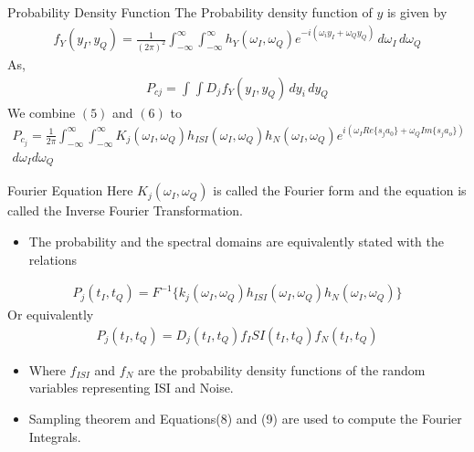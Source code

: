 \documentclass{beamer}
\begin{document}
\begin{frame}{}
\begin{block}{Probability Density Function}
 The Probability density function of $y$ is given by
 \begin{align}
     f_Y(y_I,y_Q) = \frac{1}{(2\pi)^2}\int_{-\infty}^{\infty}\int_{-\infty}^{\infty} h_Y(\omega_I,\omega_Q)e^{-i(\omega_iy _I+\omega_Qy_Q)}\,d\omega_I \,d\omega_Q
     \end{align}
As,
    \begin{align}
        P_{cj}=\int_{}^{}\int{D_j}^{}f_Y(y_I,y_Q)\,dy_i \,dy_Q
    \end{align}
We combine $(5)$ and $(6)$ to
\begin{align}
P_{c_j}=\frac{1}{2\pi}\int_{-\infty}^{\infty}\int_{-\infty}^{\infty}K_j(\omega_I,\omega_Q)h_{ISI}(\omega_I,\omega_Q)h_N(\omega_I,\omega_Q)e^{i(\omega_IRe\{s_ja_0\}+\omega_QIm\{s_ja_o\})}\\ d\omega_Id\omega_Q    
\end{align}
\end{block}
\end{frame}
\begin{frame}{}
    \begin{block}{Fourier Equation}
     Here $K_j(\omega_I,\omega_Q)$ is called the Fourier form and the equation is called the Inverse Fourier Transformation.
     \begin{itemize}
         \item The probability and the spectral domains are equivalently stated with the relations
     \end{itemize}
     \begin{align}
        P_j(t_I,t_Q)=F^{-1}\{k_j(\omega_I,\omega_Q)h_{ISI}(\omega_I,\omega_Q)h_N(\omega_I,\omega_Q)\} 
     \end{align}
     Or equivalently
     \begin{align}
        P_j(t_I,t_Q)=D_j(t_I,t_Q)f_ISI(t_I,t_Q)f_N(t_I,t_Q)
     \end{align}
     \begin{itemize}
         \item  Where $f_{ISI}$ and $f_{N}$ are the probability density functions of the random variables representing ISI and Noise.
         \item Sampling theorem and Equations(8) and (9) are used to compute the Fourier Integrals.
     \end{itemize}
    \end{block}
\end{frame}
\end{document}
